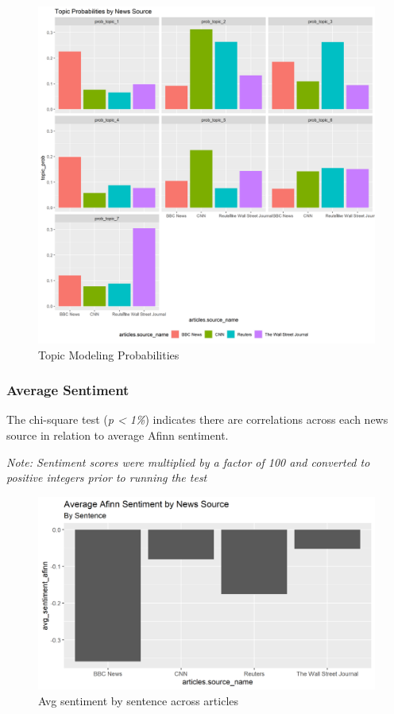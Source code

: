 \documentclass[
]{article}
\begin{document}
\begin{figure}
\centering
\includegraphics{../figures/topic_probabilities_news_source.png}
\caption{Topic Modeling Probabilities}
\end{figure}

\hypertarget{average-sentiment}{%
\subsubsection{Average Sentiment}\label{average-sentiment}}

The chi-square test (\emph{p \textless{} 1\%}) indicates there are
correlations across each news source in relation to average Afinn
sentiment.

\emph{Note: Sentiment scores were multiplied by a factor of 100 and
converted to positive integers prior to running the test}

\begin{figure}
\centering
\includegraphics{../figures/sentence_afinn_sentiment.png}
\caption{Avg sentiment by sentence across articles}
\end{figure}
\end{document}
